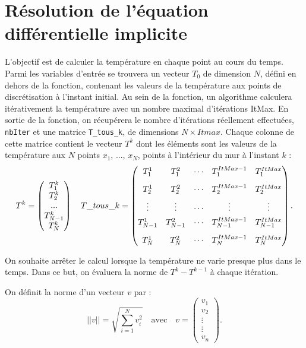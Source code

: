 \documentclass[10pt,fleqn]{article} %
\begin{document}
\section{Résolution de l'équation différentielle implicite}
\ifprof
\else
L'objectif est de calculer la température en chaque point au cours du temps. Parmi les variables
d'entrée se trouvera un vecteur $T_0$ de dimension $N$, défini en dehors de la fonction,
 contenant les valeurs de la température aux points de discrétisation à l'instant initial. 
 Au sein de la fonction, un algorithme calculera itérativement la température avec un 
 nombre maximal d'itérations ItMax. En sortie de la fonction, on récupérera le nombre 
 d'itérations réellement effectuées, \texttt{nbIter} et une matrice \texttt{T\_tous\_k}, de
  dimensions $N\times Itmax$.  Chaque colonne de cette matrice contient le vecteur $T^k$
   dont les éléments sont les valeurs de la température aux $N$ points $x_1$, ..., $x_N$, 
 points à l'intérieur du mur à l'instant $k$ :
$$
T^k = \begin{pmatrix} T_1^k \\  T_2 ^k \\ ... \\  T_{N-1}^{k} \\ T_{N}^{k}  \end{pmatrix}
\quad
T\_tous\_k = 
\begin{pmatrix} 
T_1^1   & T_1^2  & \cdots & T_1^{ItMax-1} & T_{1}^{ItMax} \vspace{0.3cm} \\
T_2^1   & T_2^2  & \cdots & T_2^{ItMax-1} & T_2^{ItMax }  \vspace{0.15cm}\\
\vdots & \vdots & \cdots & \vdots & \vdots \vspace{0.15cm}\\
T_{N-1}^1   & T_{N-1}^2  & \cdots & T_{N-1}^{ItMax-1} & T_{N-1}^{ItMax} \vspace{0.3cm} \\
T_{N}^1   & T_{N}^2  & \cdots & T_{N}^{ItMax-1} & T_{N}^{ItMax}  \\
 \end{pmatrix}.
$$


On souhaite arrêter le calcul lorsque la température ne varie presque plus dans le temps. 
Dans ce but, on évaluera la norme  de $T^k - T^{k-1}$ à chaque itération. 
\begin{defi}
On définit la norme d'un vecteur $v$ par : 
$$
||v|| = \sqrt{\sum\limits_{i=1}^{N}v_i^2} \quad \text{avec} \quad v=
\begin{pmatrix} v_1 \\ v_2 \\ \vdots \\ \vdots \\ v_n \end{pmatrix}.
$$
\end{defi}
\end{document}
